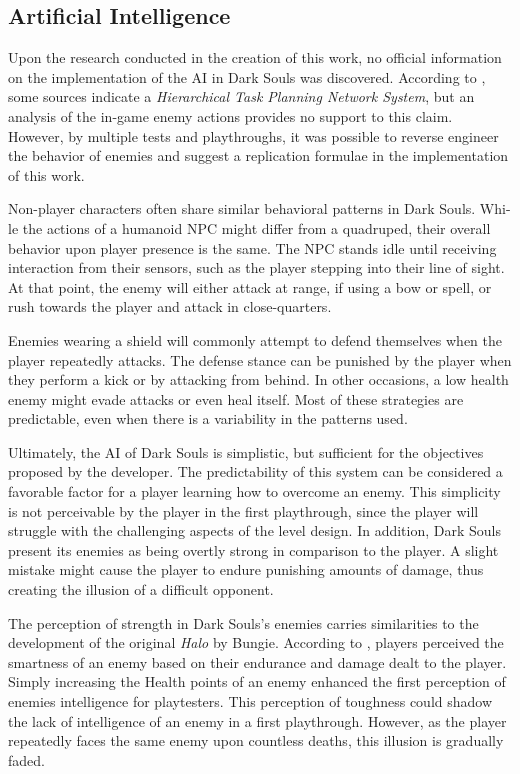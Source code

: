 \subsection{Artificial Intelligence}

Upon the research conducted in the creation of this work, no official information on the implementation of the AI in Dark Souls was discovered. According to , some sources indicate a \emph{Hierarchical Task Planning Network System}, but an analysis of the in-game enemy actions provides no support to this claim. However, by multiple tests and playthroughs, it was possible to reverse engineer the behavior of enemies and suggest a replication formulae in the implementation of this work.

Non-player characters often share similar behavioral patterns in Dark Souls. Whi\hyp{}le the actions of a humanoid NPC might differ from a quadruped, their overall behavior upon player presence is the same. The NPC stands idle until receiving interaction from their sensors, such as the player stepping into their line of sight. At that point, the enemy will either attack at range, if using a bow or spell, or rush towards the player and attack in close-quarters.

Enemies wearing a shield will commonly attempt to defend themselves when the player repeatedly attacks. The defense stance can be punished by the player when they perform a kick or by attacking from behind. In other occasions, a low health enemy might evade attacks or even heal itself. Most of these strategies are predictable, even when there is a variability in the patterns used.

Ultimately, the AI of Dark Souls is simplistic, but sufficient for the objectives proposed by the developer. The predictability of this system can be considered a favorable factor for a player learning how to overcome an enemy. This simplicity is not perceivable by the player in the first playthrough, since the player will struggle with the challenging aspects of the level design. In addition, Dark Souls present its enemies as being overtly strong in comparison to the player. A slight mistake might cause the player to endure punishing amounts of damage, thus creating the illusion of a difficult opponent.

The perception of strength in Dark Souls's enemies carries similarities to the development of the original \emph{Halo} by Bungie. According to , players perceived the smartness of an enemy based on their endurance and damage dealt to the player. Simply increasing the Health points of an enemy enhanced the first perception of enemies intelligence for playtesters. This perception of toughness could shadow the lack of intelligence of an enemy in a first playthrough. However, as the player repeatedly faces the same enemy upon countless deaths, this illusion is gradually faded.

